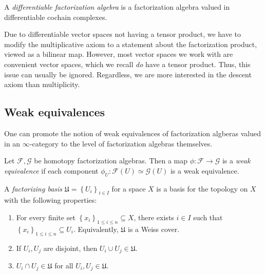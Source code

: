 \begin{definition}\label{dfn:6-1-15}
	A \emph{differentiable factorization algebra} is a factorization algebra valued in differentiable cochain complexes.
\end{definition}
Due to differentiable vector spaces not having a tensor product, we have to modify the multiplicative axiom to a statement about the factorization product, viewed as a bilinear map. However, most vector spaces we work with are convenient vector spaces, which we recall \emph{do} have a tensor product. Thus, this issue can usually be ignored. Regardless, we are more interested in the descent axiom than multiplicity.

\subsection{Weak equivalences}

One can promote the notion of weak equivalences of factorization algberas valued in an $\infty $-category to the level of factorization algebras themselves.

\begin{definition}\label{dfn:6-1-16}
	Let $\mathcal{F} ,\mathcal{G} $ be homotopy factorization algebras. Then a map $\phi : \mathcal{F}  \to \mathcal{G} $ is a \emph{weak equivalence} if each component $\phi _U : \mathcal{F} (U) \simeq \mathcal{G} (U)$ is a weak equivalence.
\end{definition}

\begin{definition}\label{dfn:6-1-17}
	A \emph{factorizing basis} $\mathfrak{U} =\left\{ U_i \right\} _{i\in I} $ for a space $X$ is a basis for the topology on $X$ with the following properties:
	\begin{enumerate}
		\item For every finite set $\left\{ x_i \right\} _{1\leq i\leq n} \subseteq X$, there exists $i\in I$ such that $\left\{ x_i \right\} _{1\leq i\leq n} \subseteq U_i$. Equivalently, $\mathfrak{U} $ is a Weiss cover.
		\item If $U_i,U_j$ are disjoint, then $U_i \cup U_j\in \mathfrak{U} $.
		\item $U_i \cap U_j\in \mathfrak{U} $ for all $U_i,U_j\in \mathfrak{U} $.
	\end{enumerate}
\end{definition}


